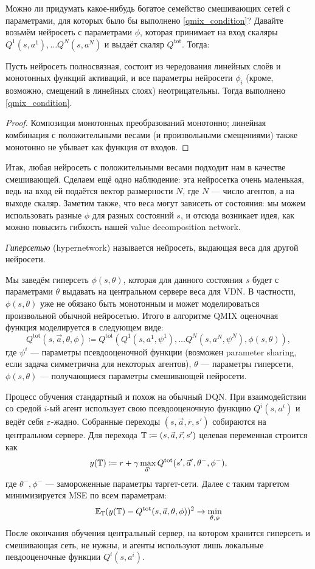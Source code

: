 Можно ли придумать какое-нибудь богатое семейство смешивающих сетей с параметрами, для которых было бы выполнено \eqref{qmix_condition}? Давайте возьмём нейросеть с параметрами $\phi$, которая принимает на вход скаляры $Q^1(s, a^1), \dots Q^N(s, a^N)$ и выдаёт скаляр $Q^{\mathrm{tot}}$. Тогда:
\begin{proposition}
Пусть нейросеть полносвязная, состоит из чередования линейных слоёв и монотонных функций активаций, и все параметры нейросети $\phi_i$ (кроме, возможно, смещений в линейных слоях) неотрицательны. Тогда выполнено \eqref{qmix_condition}.
\begin{proof}
Композиция монотонных преобразований монотонно; линейная комбинация с положительными весами (и произвольными смещениями) также монотонно не убывает как функция от входов.
\end{proof}
\end{proposition}

Итак, любая нейросеть с положительными весами подходит нам в качестве смешивающей. Сделаем ещё одно наблюдение: эта нейросетка очень маленькая, ведь на вход ей подаётся вектор размерности $N$, где $N$ --- число агентов, а на выходе скаляр. Заметим также, что веса могут зависеть от состояния: мы можем использовать разные $\phi$ для разных состояний $s$, и отсюда возникает идея, как можно повысить гибкость нашей value decomposition network.

\begin{definition}
\emph{Гиперсетью} (hypernetwork) называется нейросеть, выдающая веса для другой нейросети.
\end{definition}

Мы заведём гиперсеть $\phi(s, \theta)$, которая для данного состояния $s$ будет с параметрами $\theta$ выдавать на центральном сервере веса для VDN. В частности, $\phi(s, \theta)$ уже не обязано быть монотонным и может моделироваться произвольной обычной нейросетью. Итого в алгоритме QMIX оценочная функция моделируется в следующем виде:
$$Q^{\mathrm{tot}}(s, \vec{a}, \theta, \phi) \coloneqq Q^{\mathrm{tot}}( Q^1(s, a^1, \psi^1), \dots Q^N(s, a^N, \psi^N), \phi(s, \theta)),$$
где $\psi^i$ --- параметры псевдооценочной функции (возможен parameter sharing, если задача симметрична для некоторых агентов), $\theta$ --- параметры гиперсети, $\phi(s, \theta)$ --- получающиеся параметры смешивающей нейросети.

Процесс обучения стандартный и похож на обычный DQN. При взаимодействии со средой $i$-ый агент использует свою псевдооценочную функцию $Q^i(s, a^i)$ и ведёт себя $\varepsilon$-жадно. Собранные переходы $(s, \vec{a}, r, s')$ собираются на центральном сервере. Для перехода $\mathbb{T} \coloneqq (s, \vec{a}, \vec{r}, s')$ целевая переменная строится как 
$$y(\mathbb{T}) \coloneqq r + \gamma \max_{\vec{a}'} Q^{\mathrm{tot}}(s', \vec{a}', \theta^-, \phi^-),$$
где $\theta^-, \phi^-$ --- замороженные параметры таргет-сети. Далее с таким таргетом минимизируется MSE по всем параметрам:
$$\mathbb{E}_{\mathbb{T}} (y(\mathbb{T}) - Q^{\mathrm{tot}}(s, \vec{a}, \theta, \phi))^2 \to \min_{\theta, \phi}$$
После окончания обучения центральный сервер, на котором хранится гиперсеть и смешивающая сеть, не нужны, и агенты используют лишь локальные певдооценочные функции $Q^i(s, a^i)$.

